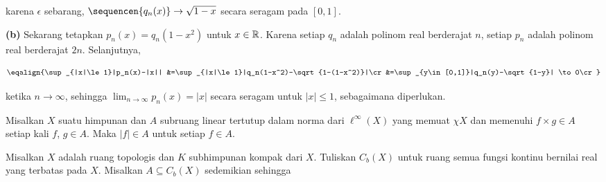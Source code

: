 {
      
\noindent karena $\epsilon$ sebarang,
$\sequencen{q_n(x)}\to\sqrt{1-x}$ secara seragam pada $[0,1]$.
      
\medskip
      
{\bf (b)} Sekarang tetapkan $p_n(x)=q_n(1-x^2)$ untuk $x\in\Bbb R$.
Karena setiap $q_n$ adalah polinom real berderajat $n$, setiap $p_n$ adalah
polinom real berderajat $2n$. Selanjutnya,
      
$$\eqalign{\sup_{|x|\le 1}|p_n(x)-|x||
&=\sup_{|x|\le 1}|q_n(1-x^2)-\sqrt{1-(1-x^2)}|\cr
&=\sup_{y\in[0,1]}|q_n(y)-\sqrt{1-y}|
\to 0\cr}$$
      
\noindent ketika $n\to\infty$, sehingga
$\lim_{n\to\infty}p_n(x)=|x|$ secara seragam untuk $|x|\le 1$,
sebagaimana diperlukan.
}%
      
 Misalkan $X$ suatu himpunan dan $A$ subruang linear
tertutup dalam norma dari $\ell^{\infty}(X)$ yang memuat $\chi X$ dan memenuhi
$f\times g\in A$ setiap kali $f$, $g\in A$. Maka $|f|\in A$ untuk setiap
$f\in A$.
      
 Misalkan $X$ adalah
ruang topologis dan $K$ subhimpunan kompak dari $X$. Tuliskan $C_b(X)$ untuk
ruang semua fungsi kontinu bernilai real yang terbatas pada $X$. Misalkan
$A\subseteq C_b(X)$ sedemikian sehingga
      
      
      
